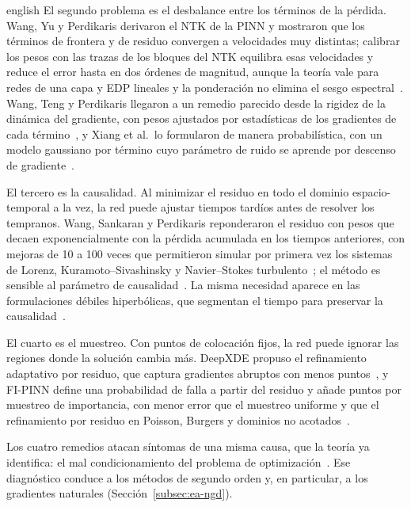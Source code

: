 \documentclass[0000.tex]{subfiles}
\begin{document}
\begin{hyphenrules}{english}
El segundo problema es el desbalance entre los términos de la pérdida. Wang, Yu y Perdikaris derivaron el NTK de la PINN y mostraron que los términos de frontera y de residuo convergen a velocidades muy distintas; calibrar los pesos con las trazas de los bloques del NTK equilibra esas velocidades y reduce el error hasta en dos órdenes de magnitud, aunque la teoría vale para redes de una capa y EDP lineales y la ponderación no elimina el sesgo espectral~\cite{wang2022and}. Wang, Teng y Perdikaris llegaron a un remedio parecido desde la rigidez de la dinámica del gradiente, con pesos ajustados por estadísticas de los gradientes de cada término~\cite{wang2021understanding}, y Xiang et al.\ lo formularon de manera probabilística, con un modelo gaussiano por término cuyo parámetro de ruido se aprende por descenso de gradiente~\cite{xiang2022self}.

El tercero es la causalidad. Al minimizar el residuo en todo el dominio espacio-temporal a la vez, la red puede ajustar tiempos tardíos antes de resolver los tempranos. Wang, Sankaran y Perdikaris reponderaron el residuo con pesos que decaen exponencialmente con la pérdida acumulada en los tiempos anteriores, con mejoras de 10 a 100 veces que permitieron simular por primera vez los sistemas de Lorenz, Kuramoto--Sivashinsky y Navier--Stokes turbulento~\cite{wang2022respecting}; el método es sensible al parámetro de causalidad~\cite{wang2023expert}. La misma necesidad aparece en las formulaciones débiles hiperbólicas, que segmentan el tiempo para preservar la causalidad~\cite{chaumet2024improving}.

El cuarto es el muestreo. Con puntos de colocación fijos, la red puede ignorar las regiones donde la solución cambia más. DeepXDE propuso el refinamiento adaptativo por residuo, que captura gradientes abruptos con menos puntos~\cite{lu2021deepxde}, y FI-PINN define una probabilidad de falla a partir del residuo y añade puntos por muestreo de importancia, con menor error que el muestreo uniforme y que el refinamiento por residuo en Poisson, Burgers y dominios no acotados~\cite{gao2023failure}.

Los cuatro remedios atacan síntomas de una misma causa, que la teoría ya identifica: el mal condicionamiento del problema de optimización~\cite{de2024numerical,zhang2026physics}. Ese diagnóstico conduce a los métodos de segundo orden y, en particular, a los gradientes naturales (Sección~\ref{subsec:ea-ngd}).


\end{hyphenrules}
\end{document}
